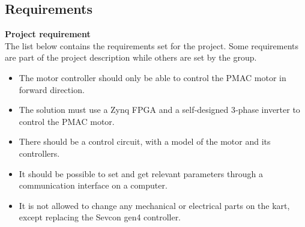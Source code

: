 
\subsection{Requirements}

\textbf{Project requirement} \\
The list below contains the requirements set for the project. Some requirements are part of the project description \cite{Project 1. semester - S19} while others are set by the group.

\begin{itemize}
\item The motor controller should only be able to control the PMAC motor in forward direction.

\item The solution must use a Zynq FPGA and a self‐designed 3‐phase inverter to control the PMAC motor.

\item There should be a control circuit, with a model of the motor and its controllers.

\item It should be possible to set and get relevant parameters through a communication interface on a computer. 

\item It is not allowed to change any mechanical or electrical parts on the kart, except replacing the Sevcon gen4 controller. 


\end{itemize}